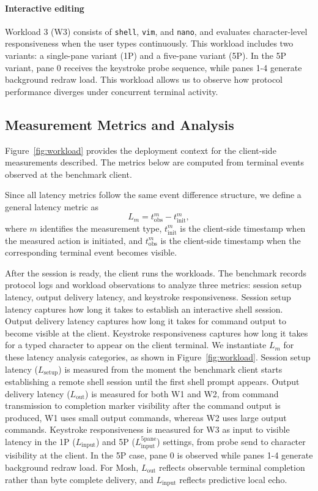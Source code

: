 \paragraph{Interactive editing}
Workload 3 (W3) consists of \texttt{shell}, \texttt{vim}, and \texttt{nano}, and evaluates character-level responsiveness when the user types continuously. This workload includes two variants: a single-pane variant (1P) and a five-pane variant (5P). In the 5P variant, pane 0 receives the keystroke probe sequence, while panes 1-4 generate background redraw load. This workload allows us to observe how protocol performance diverges under concurrent terminal activity.

\subsection{Measurement Metrics and Analysis}
\label{subsec:measurement-analysis}

Figure~\ref{fig:workload} provides the deployment context for the client-side measurements described. The metrics below are computed from terminal events observed at the benchmark client.

Since all latency metrics follow the same event difference structure, we define a general latency metric as
\begin{equation}
L_m = t_{\mathrm{obs}}^{m} - t_{\mathrm{init}}^{m},
\end{equation}
where $m$ identifies the measurement type, $t_{\mathrm{init}}^{m}$ is the client-side timestamp when the measured action is initiated, and $t_{\mathrm{obs}}^{m}$ is the client-side timestamp when the corresponding terminal event becomes visible.

After the session is ready, the client runs the workloads. The benchmark records protocol logs and workload observations to analyze three metrics: session setup latency, output delivery latency, and keystroke responsiveness. Session setup latency captures how long it takes to establish an interactive shell session. Output delivery latency captures how long it takes for command output to become visible at the client. Keystroke responsiveness captures how long it takes for a typed character to appear on the client terminal. We instantiate $L_m$ for these latency analysis categories, as shown in Figure~\ref{fig:workload}. Session setup latency ($L_{\mathrm{setup}}$) is measured from the moment the benchmark client starts establishing a remote shell session until the first shell prompt appears. Output delivery latency ($L_{\mathrm{out}}$) is measured for both W1 and W2, from command transmission to completion marker visibility after the command output is produced, W1 uses small output commands, whereas W2 uses large output commands. Keystroke responsiveness is measured for W3 as input to visible latency in the 1P ($L_{\mathrm{input}}$) and 5P ($L_{\mathrm{input}}^{\mathrm{5pane}}$) settings, from probe send to character visibility at the client. In the 5P case, pane 0 is observed while panes 1-4 generate background redraw load. For Mosh, $L_{\mathrm{out}}$ reflects observable terminal completion rather than byte complete delivery, and $L_{\mathrm{input}}$ reflects predictive local echo.


